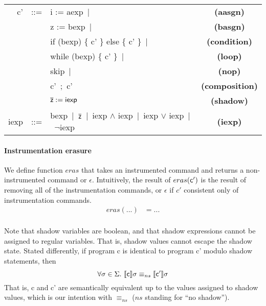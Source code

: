 \documentclass[]{article}
\newcommand{\lsyn}{[\![}
\newcommand{\rsyn}{]\!]}
\begin{document}
\begin{tabular}{rclc}
	{\sf c'} & ::= & {\sf i := aexp}\ $|$ & {\bf (aasgn)}\\
	& 		  & {\sf z := bexp}\ $|$ & {\bf (basgn)} \\
	& 	 & {\sf if (bexp) \{ c' \} else \{ c' \}}\ $|$ & {\bf (condition)}\\
	& 	 & {\sf while (bexp) \{ c' \}}\ $|$ & {\bf (loop)}\\
			 		 & 	 & {\sf skip}\ $|$ & {\bf (nop)}\\
	& 	 & {\sf c'\ ;\ c'} & {\bf (composition)}\\
			 		  &  	  & ${\sf \overline{z} := iexp}$ & {\bf (shadow)} \\
   {\sf iexp}  & ::=  & {\sf bexp}\ $|$\ ${\sf \overline{z}}$\ $|$\
								{\sf iexp} $\wedge$ {\sf iexp}\ $|$\ {\sf iexp} $\vee$ {\sf iexp}\ $|$\ $\neg${\sf iexp} & {\bf (iexp)} \\			 		  
\end{tabular}

\newcommand{\instrEras}{\ensuremath{eras}}
\newcommand{\nocommand}{\ensuremath{\epsilon}}
\paragraph{Instrumentation erasure} We define function $\instrEras$ that takes an instrumented command and returns a non-instrumented command or $\nocommand$. Intuitively, the result of $\instrEras({\sf c'})$ is the result of removing all of the instrumentation commands, or $\nocommand$ if $c'$ consistent only of instrumentation commands.
\begin{align*}
  \instrEras(...) &= ...\\
\end{align*}

Note that shadow variables are boolean, and that shadow expressions cannot be assigned to regular variables. That is, shadow values cannot escape the shadow state. Stated differently, if program {\sf c} is identical to program {\sf c'} modulo shadow statements, then
$$
	\forall \sigma \in \Sigma.\ \lsyn {\sf c} \rsyn \sigma \equiv_{ns} \lsyn {\sf c'} \rsyn \sigma
$$
That is, {\sf c} and {\sf c'} are semantically equivalent up to the values assigned to shadow values, which is our intention with $\equiv_{ns}$ ($ns$ standing for ``no shadow'').
\end{document}

